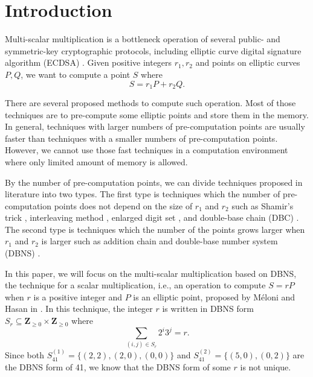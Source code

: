 \section{Introduction}

Multi-scalar multiplication is a bottleneck operation of several public- and symmetric-key cryptographic protocols,
including elliptic curve digital signature algorithm (ECDSA) \cite{ECDSA}.
Given positive integers $r_1, r_2$ and points on elliptic curves $P, Q$,
we want to compute a point $S$ where
$$S = r_1 P + r_2 Q.$$

There are several proposed methods to compute such operation.
Most of those techniques are to pre-compute some elliptic points  and store them in the memory.
In general, techniques with larger numbers of pre-computation points are usually faster than techniques with a smaller numbers of pre-computation points.
However, we cannot use those fast techniques in a computation environment where only limited amount of memory is allowed.

By the number of pre-computation points, we can divide techniques proposed in literature into two types.
The first type is techniques which the number of pre-computation points does not depend on the size of $r_1$ and $r_2$ such as Shamir’s trick \cite{Shamir},
interleaving method \cite{interleaving}, enlarged digit set \cite{enlarged2,enlarged4,enlarged1,enlarged3}, and double-base chain (DBC) \cite{dbc2,dbc3,dbc1}.
The second type is techniques which the number of the points grows larger when $r_1$ and $r_2$ is larger such as addition chain \cite{additionChain1,additionChain2}
and double-base number system (DBNS)  \cite{dbns}.

In this paper, we will focus on the multi-scalar multiplication based on DBNS,
the technique for a scalar multiplication, i.e., an operation to compute $S = rP$ when $r$ is a positive integer and $P$ is an elliptic point, 
proposed by M\'eloni and Hasan in \cite{dbns}.
In this technique, the integer $r$ is written in DBNS form $S_r \subseteq \mathbf{Z}_{\geq 0} \times \mathbf{Z}_{\geq 0}$ where
$$\sum_{(i,j) \in S_r} 2^i 3^j = r.$$ 
Since both $S^{(1)}_{41} = \{(2,2), (2,0), (0,0)\}$ and $S^{(2)}_{41} = \{(5,0), (0,2)\}$ are the DBNS form of 41, we know that the DBNS form of some $r$ is not unique.


